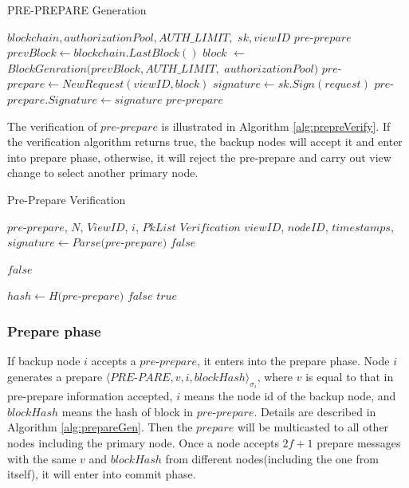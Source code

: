  \begin{algorithm}
 \caption{PRE-PREPARE Generation}\label{alg:preprepareGen}
   \begin{algorithmic}[H]
   \renewcommand{\algorithmicrequire}{\textbf{Input:}}
   \renewcommand{\algorithmicensure}{\textbf{Output:}}
   \REQUIRE $blockchain, authorizationPool, AUTH\_LIMIT,$ $sk, viewID$
   \ENSURE  $pre$-$prepare$
    \STATE $prevBlock \gets blockchain.LastBlock()$
    \STATE $block$ $\gets$ $BlockGenration(prevBlock, AUTH\_LIMIT,$ $authorizationPool)$
    \STATE $pre$-$prepare \gets NewRequest(viewID, block)$
    \STATE $signature \gets sk.Sign(request)$
    \STATE $pre$-$prepare.Signature \gets signature$
   \RETURN $pre$-$prepare$
   \end{algorithmic}
 \end{algorithm}

The verification of $pre$-$prepare$ is illustrated in Algorithm \ref{alg:prepreVerify}. If the verification algorithm returns true, the backup nodes will accept it and enter into prepare phase, otherwise, it will reject the pre-prepare and carry out view change to select another primary node.

 \begin{algorithm}
 \caption{Pre-Prepare Verification}
   \begin{algorithmic}[H]\label{alg:prepreVerify}
   \renewcommand{\algorithmicrequire}{\textbf{Input:}}
   \renewcommand{\algorithmicensure}{\textbf{Output:}}
   \REQUIRE $pre$-$prepare$, $N$, $ViewID$, $i$, $PkList$
   \ENSURE  $Verification$
    \STATE $viewID$, $nodeID$, $timestamps$, $signature \gets Parse(pre$-$prepare)$
      \RETURN $false$
    \ENDIF

      \RETURN $false$
    \ENDIF

    \STATE $hash \gets H(pre$-$prepare)$
      \RETURN $false$
    \ENDIF
   \RETURN $true$
   \end{algorithmic}
 \end{algorithm}

\subsubsection{Prepare phase}

If backup node $i$ accepts a $pre$-$prepare$, it enters into the prepare phase. Node $i$ generates a prepare $\langle PRE$-$PARE, v, i, blockHash\rangle_{\sigma_{i}}$, where $v$ is equal to that in pre-prepare information accepted, $i$ means the node id of the backup node, and $blockHash$ means the hash of block in $pre$-$prepare$. Details are described in Algorithm \ref{alg:prepareGen}. Then the $prepare$ will be multicasted to all other nodes including the primary node. Once a node accepts $2f+1$ prepare messages with the same $v$ and $blockHash$ from different nodes(including the one from itself), it will enter into commit phase.

